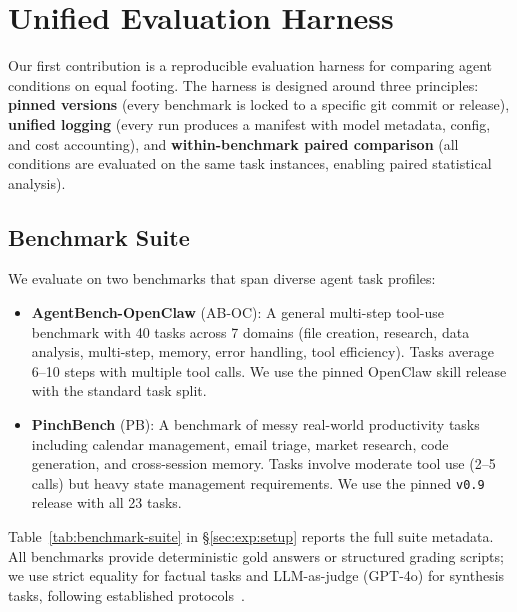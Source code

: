 \section{Unified Evaluation Harness}
\label{sec:harness}

Our first contribution is a reproducible evaluation harness for comparing agent conditions on equal footing. The harness is designed around three principles: \textbf{pinned versions} (every benchmark is locked to a specific git commit or release), \textbf{unified logging} (every run produces a manifest with model metadata, config, and cost accounting), and \textbf{within-benchmark paired comparison} (all conditions are evaluated on the same task instances, enabling paired statistical analysis).


\subsection{Benchmark Suite}
\label{sec:harness:benchmarks}

We evaluate on two benchmarks that span diverse agent task profiles:

\begin{itemize}[leftmargin=1.5em, itemsep=1pt, parsep=0pt]

  \item \textbf{AgentBench-OpenClaw} (AB-OC): A general multi-step tool-use benchmark with 40 tasks across 7 domains (file creation, research, data analysis, multi-step, memory, error handling, tool efficiency). Tasks average 6--10 steps with multiple tool calls. We use the pinned OpenClaw skill release with the standard task split.

  \item \textbf{PinchBench} (PB): A benchmark of messy real-world productivity tasks including calendar management, email triage, market research, code generation, and cross-session memory. Tasks involve moderate tool use (2--5 calls) but heavy state management requirements. We use the pinned \texttt{v0.9} release with all 23 tasks.

\end{itemize}

Table~\ref{tab:benchmark-suite} in \S\ref{sec:exp:setup} reports the full suite metadata. All benchmarks provide deterministic gold answers or structured grading scripts; we use strict equality for factual tasks and LLM-as-judge (GPT-4o) for synthesis tasks, following established protocols~\citep{zheng2023judging}.

